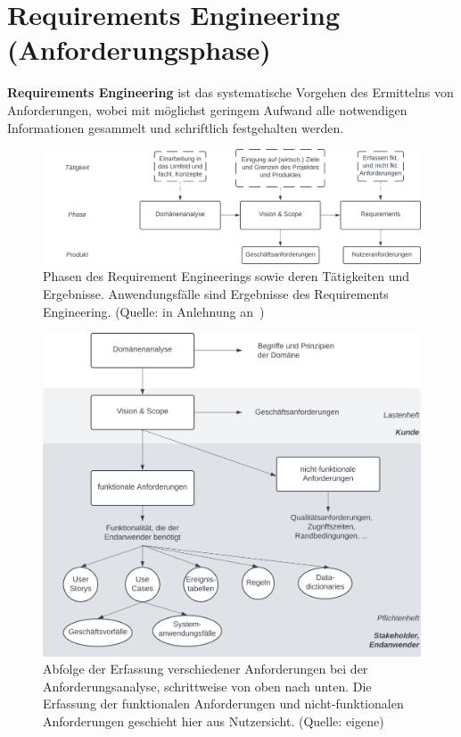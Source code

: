 \section{Requirements Engineering (Anforderungsphase)}

\begin{tcolorbox}[title=Requirements Engineering]
    \textbf{Requirements Engineering} ist das systematische Vorgehen des Ermittelns von Anforderungen,
    wobei mit möglichst geringem Aufwand alle notwendigen Informationen gesammelt und schriftlich festgehalten werden.
\end{tcolorbox}

\begin{figure}
    \centering
    \includegraphics[scale=0.35]{chapters/Anhang/CheatSheets/img/requirementsengineering}
    \caption{Phasen des Requirement Engineerings sowie deren Tätigkeiten und Ergebnisse. Anwendungsfälle sind Ergebnisse des Requirements Engineering. (Quelle: in Anlehnung an~\cite[84]{Wed09})}
    \label{fig:requirementsengineering_cc}
\end{figure}

\begin{figure}
    \centering
    \includegraphics[scale=0.35]{chapters/Anhang/CheatSheets/img/anforderung}
    \caption{Abfolge der Erfassung verschiedener Anforderungen bei der Anforderungsanalyse, schrittweise von oben nach unten. Die Erfassung der funktionalen Anforderungen und nicht-funktionalen Anforderungen geschieht hier aus Nutzersicht. (Quelle: eigene)}
    \label{fig:anforderung_cc}
\end{figure}